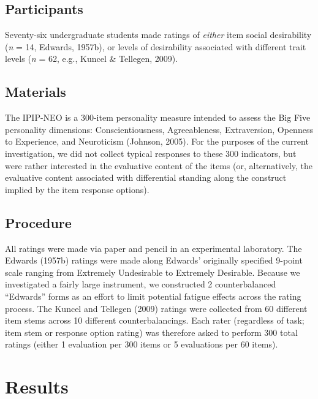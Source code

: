 \documentclass[
  ,jou]{apa6}
\begin{document}
\hypertarget{participants}{%
\subsection{Participants}\label{participants}}

Seventy-six undergraduate students made ratings of \emph{either} item social desirability (\emph{n} = 14, Edwards, 1957b), or levels of desirability associated with different trait levels (\emph{n} = 62, e.g., Kuncel \& Tellegen, 2009).

\hypertarget{materials}{%
\subsection{Materials}\label{materials}}

The IPIP-NEO is a 300-item personality measure intended to assess the Big Five personality dimensions: Conscientiousness, Agreeableness, Extraversion, Openness to Experience, and Neuroticism (Johnson, 2005). For the purposes of the current investigation, we did not collect typical responses to these 300 indicators, but were rather interested in the evaluative content of the items (or, alternatively, the evaluative content associated with differential standing along the construct implied by the item response options).

\hypertarget{procedure}{%
\subsection{Procedure}\label{procedure}}

All ratings were made via paper and pencil in an experimental laboratory. The Edwards (1957b) ratings were made along Edwards' originally specified 9-point scale ranging from Extremely Undesirable to Extremely Desirable. Because we investigated a fairly large instrument, we constructed 2 counterbalanced ``Edwards'' forms as an effort to limit potential fatigue effects across the rating process. The Kuncel and Tellegen (2009) ratings were collected from 60 different item stems across 10 different counterbalancings. Each rater (regardless of task; item stem or response option rating) was therefore asked to perform 300 total ratings (either 1 evaluation per 300 items or 5 evaluations per 60 items).

\hypertarget{results}{%
\section{Results}\label{results}}
\end{document}
